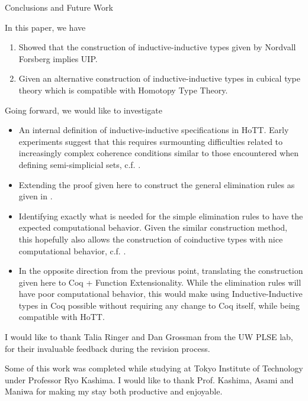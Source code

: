 \documentclass[acmsmall,review]{acmart}\settopmatter{printfolios=true,printccs=false,printacmref=false}
\def\Forsberg/{Nordvall Forsberg}
\begin{document}
\begin{section}{Conclusions and Future Work}

In this paper, we have
\begin{enumerate}
    \item Showed that the construction of inductive-inductive types given by \Forsberg/ implies UIP.
    \item Given an alternative construction of inductive-inductive types in cubical type theory which is compatible with Homotopy Type Theory.
\end{enumerate}

Going forward, we would like to investigate
\begin{itemize}
    \item An internal definition of inductive-inductive specifications in HoTT. Early experiments suggest that this requires surmounting difficulties related to increasingly complex coherence conditions similar to those encountered when defining semi-simplicial sets, c.f. \citet{simplicialsets}.
    \item Extending the proof given here to construct the general elimination rules as given in \cite{KaposiKovacsHIITsyntax}.
    \item Identifying exactly what is needed for the simple elimination rules to have the expected computational behavior. Given the similar construction method, this hopefully also allows the construction of coinductive types with nice computational behavior, c.f. \citet{nonwellfoundedtrees}.
    \item In the opposite direction from the previous point, translating the construction given here to Coq + Function Extensionality. While the elimination rules will have poor computational behavior, this would make using Inductive-Inductive types in Coq possible without requiring any change to Coq itself, while being compatible with HoTT.
\end{itemize}

\end{section}

\begin{acks}

I would like to thank Talia Ringer and Dan Grossman from the UW PLSE lab, for their invaluable feedback during the revision process.

Some of this work was completed while studying at Tokyo Institute of Technology under Professor Ryo Kashima. I would like to thank Prof. Kashima, Asami and Maniwa for making my stay both productive and enjoyable.

\end{acks}



\end{document}
